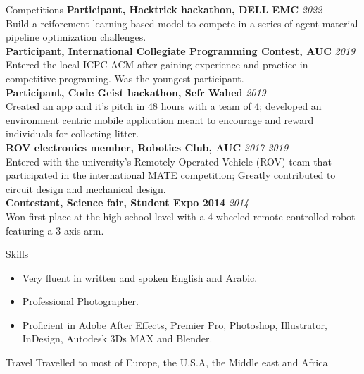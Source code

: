\documentclass{resume}
\begin{document}
\begin{small}
	\begin{rSection}{Competitions}
		{\bf Participant, Hacktrick hackathon, DELL EMC} \hfill {\em 2022} \\
		Build a reiforcment learning based model to compete in a series of agent material pipeline optimization challenges. \\
		{\bf Participant, International Collegiate Programming Contest, AUC} \hfill {\em 2019} \\
		Entered the local ICPC ACM after gaining experience and practice in competitive programing. Was the youngest participant. \\
		{\bf Participant, Code Geist hackathon, Sefr Wahed} \hfill {\em 2019} \\
		Created an app and it's pitch in 48 hours with a team of 4; developed an environment centric mobile application meant to encourage and reward individuals for collecting litter.\\
		{\bf ROV electronics member, Robotics Club, AUC} \hfill {\em 2017-2019} \\
		Entered with the university's Remotely Operated Vehicle (ROV) team that participated in the international MATE competition; Greatly contributed to circuit design and mechanical design. \\
		{\bf Contestant, Science fair, Student Expo 2014} \hfill {\em 2014} \\
		Won first place at the high school level with a 4 wheeled remote controlled robot featuring a 3-axis arm.
	\end{rSection}
	
	
	\begin{rSection}{Skills}
		\begin{itemize}
			\itemsep -0.4em
			\item Very fluent in written and spoken English and Arabic.
			\item Professional Photographer.
			\item Proficient in Adobe After Effects, Premier Pro, Photoshop, Illustrator, InDesign, Autodesk 3Ds MAX and Blender.
		\end{itemize}
	\end{rSection}
	\begin{rSection}{Travel}
		Travelled to most of Europe, the U.S.A, the Middle east and Africa
	\end{rSection}
\end{small}
	
\end{document}
